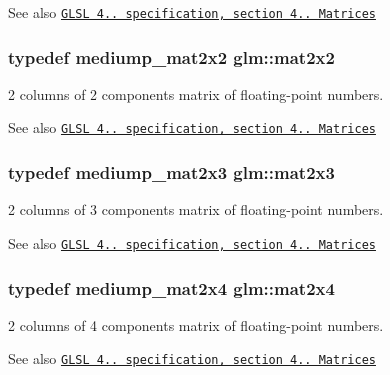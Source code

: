 \begin{DoxySeeAlso}{See also}
\href{http://www.opengl.org/registry/doc/GLSLangSpec.4.20.8.pdf}{\tt G\+L\+S\+L 4.. specification, section 4.. Matrices} 
\end{DoxySeeAlso}
\hypertarget{group__core__types_gac35d9aae8d7beaceba6d18f6e26261a4}{}
\subsubsection[{mat2x2}]{\setlength{\rightskip}{0pt plus 5cm}typedef mediump\+\_\+mat2x2 {\bf glm\+::mat2x2}}\label{group__core__types_gac35d9aae8d7beaceba6d18f6e26261a4}
2 columns of 2 components matrix of floating-\/point numbers.

\begin{DoxySeeAlso}{See also}
\href{http://www.opengl.org/registry/doc/GLSLangSpec.4.20.8.pdf}{\tt G\+L\+S\+L 4.. specification, section 4.. Matrices} 
\end{DoxySeeAlso}
\hypertarget{group__core__types_gad23070b803932f5f3c9d9c2fd4d64895}{}
\subsubsection[{mat2x3}]{\setlength{\rightskip}{0pt plus 5cm}typedef mediump\+\_\+mat2x3 {\bf glm\+::mat2x3}}\label{group__core__types_gad23070b803932f5f3c9d9c2fd4d64895}
2 columns of 3 components matrix of floating-\/point numbers.

\begin{DoxySeeAlso}{See also}
\href{http://www.opengl.org/registry/doc/GLSLangSpec.4.20.8.pdf}{\tt G\+L\+S\+L 4.. specification, section 4.. Matrices} 
\end{DoxySeeAlso}
\hypertarget{group__core__types_gaa78542b8bfa06cd48c53dcd0d0a00707}{}
\subsubsection[{mat2x4}]{\setlength{\rightskip}{0pt plus 5cm}typedef mediump\+\_\+mat2x4 {\bf glm\+::mat2x4}}\label{group__core__types_gaa78542b8bfa06cd48c53dcd0d0a00707}
2 columns of 4 components matrix of floating-\/point numbers.

\begin{DoxySeeAlso}{See also}
\href{http://www.opengl.org/registry/doc/GLSLangSpec.4.20.8.pdf}{\tt G\+L\+S\+L 4.. specification, section 4.. Matrices} 
\end{DoxySeeAlso}
\hypertarget{group__core__types_gadfaff2a7dce5cbf4e77a47ecea42ac5b}{}
